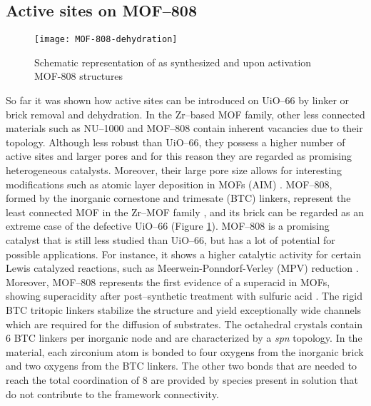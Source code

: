 \subsection*{Active sites on MOF--808}
\begin{figure}[!htbp]
	\centering
	\texttt{[image: MOF-808-dehydration]}
	\caption{Schematic representation of as synthesized and upon activation MOF-808 structures}
	\label{fig:MOF-808-dehydration}
\end{figure}
So far it was shown how active sites can be introduced on UiO--66 by linker or brick removal and dehydration. In the Zr--based MOF family, other less connected materials such as NU--1000 and MOF--808 contain inherent vacancies due to their topology. Although less robust than UiO--66, they possess a higher number of active sites and larger pores and for this reason they are regarded as promising heterogeneous catalysts. Moreover, their large pore size allows for interesting modifications such as atomic layer deposition in MOFs (AIM) \cite{mondloch2013vapor}.
MOF--808, formed by the inorganic  cornestone and trimesate (BTC) linkers, represent the least connected MOF in the Zr--MOF family \cite{furukawa2014water}, and its brick can be regarded as an extreme case of the defective UiO--66 (Figure \ref{fig:MOF-808-dehydration}). 
MOF--808 is a promising catalyst that is still less studied than UiO--66, but has a lot of potential for possible applications. For instance, it shows a higher catalytic activity for certain Lewis catalyzed reactions, such as Meerwein-Ponndorf-Verley (MPV) reduction \cite{plessers2016zr, mautschke2018catalytic}. Moreover, MOF--808 represents the first evidence of a superacid in MOFs, showing superacidity after post--synthetic treatment with sulfuric acid \cite{jiang2014superacidity}.
\npar
The rigid BTC tritopic linkers stabilize the structure and yield exceptionally wide channels which are required for the diffusion of substrates. The octahedral crystals contain 6 BTC linkers per inorganic node and are characterized by a \textit{spn} topology. 
In the material, each zirconium atom is bonded to four oxygens from the inorganic brick and two oxygens from the BTC linkers. The other two bonds that are needed to reach the total coordination of 8 are provided by species present in solution that do not contribute to the framework connectivity. 
\npar

